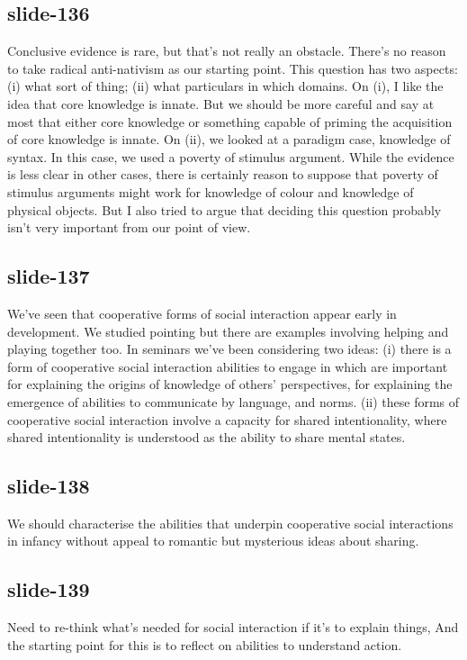 \documentclass[12pt,\papersize]{extarticle}
\begin{document}
 
\subsection{slide-136}
Conclusive evidence is rare, but that's not really an obstacle.
There's no reason to take radical anti-nativism as our starting point.
This question has two aspects: (i) what sort of thing; (ii) what particulars in which domains.
On (i), I like the idea that core knowledge is innate.
But we should be more careful and say at most that either core knowledge or something capable of priming the acquisition of core knowledge is innate.
On (ii), we looked at a paradigm case, knowledge of syntax.
In this case, we used a poverty of stimulus argument.
While the evidence is less clear in other cases, there is certainly reason to suppose that poverty of stimulus arguments might work for knowledge of colour and knowledge of physical objects.
But I also tried to argue that deciding this question probably isn't very important from our point of view.
 
 
\subsection{slide-137}
We've seen that cooperative forms of social interaction appear early in development.
We studied pointing but there are examples involving helping and playing together too.
In seminars we've been considering two ideas:
(i) there is a form of cooperative social interaction abilities to engage in which are important for explaining the origins of knowledge of others' perspectives, for explaining the emergence of abilities to communicate by language, and norms.
(ii) these forms of cooperative social interaction involve a capacity for shared intentionality,
where shared intentionality is understood as the ability to share mental states.
 
 
\subsection{slide-138}
We should characterise the abilities that underpin cooperative social interactions in infancy without appeal to romantic but mysterious ideas about sharing.
 
 
\subsection{slide-139}
Need to re-think what's needed for social interaction if it's to explain things,
And the starting point for this is to reflect on abilities to understand action.
 
\end{document}
